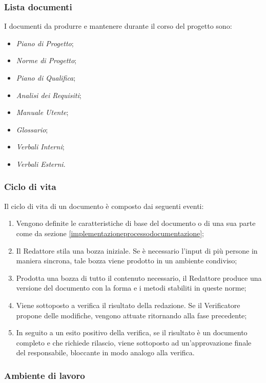 \subsubsection{Lista documenti}
I documenti da produrre e mantenere durante il corso del progetto sono:
\begin{itemize}
  \item \emph{Piano di Progetto};
  \item \emph{Norme di Progetto};
  \item \emph{Piano di Qualifica};
  \item \emph{Analisi dei Requisiti};
  \item \emph{Manuale Utente};
  \item \emph{Glossario};
  \item \emph{Verbali Interni};
  \item \emph{Verbali Esterni}.
\end{itemize}

\subsubsection{Ciclo di vita}
Il ciclo di vita di un documento è composto dai seguenti eventi:
\begin{enumerate}
  \item Vengono definite le caratteristiche di base del documento o di una sua parte come da sezione \ref{implementazioneprocessodocumentazione};
  \item Il Redattore stila una bozza iniziale. Se è necessario l'input di più persone in maniera sincrona, tale bozza viene prodotto in un ambiente condiviso;
  \item Prodotta una bozza di tutto il contenuto necessario, il Redattore produce una versione del documento con la forma e i metodi stabiliti in queste norme;
  \item Viene sottoposto a verifica il risultato della redazione. Se il Verificatore propone delle modifiche, vengono attuate ritornando alla fase precedente;
  \item In seguito a un esito positivo della verifica, se il risultato è un documento completo e che richiede rilascio, viene sottoposto ad un'approvazione finale del responsabile, bloccante in modo analogo alla verifica.
\end{enumerate}

\subsubsection{Ambiente di lavoro}
